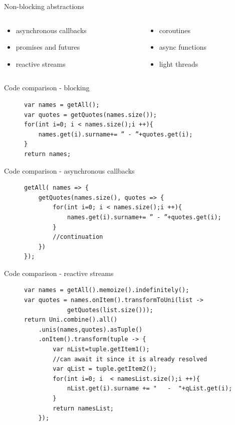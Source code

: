 \documentclass{beamer}
\begin{document}
\begin{frame}{Non-blocking abstractions}
    \begin{columns}
        \begin{column}{0.5\textwidth}
            \begin{itemize}
                \item asynchronous callbacks
                \item promises and futures
                \item reactive streams
            \end{itemize}
        \end{column}
        \begin{column}{0.5\textwidth}
            \begin{itemize}
                \item coroutines
                \item async functions
                \item light threads
            \end{itemize}
        \end{column}
    \end{columns}
\end{frame}
\begin{frame}[fragile]{Code comparison - blocking}
    \begin{figure}
        \begin{lstlisting}
var names = getAll();
var quotes = getQuotes(names.size());
for(int i=0; i < names.size();i ++){
    names.get(i).surname+= ” - ”+quotes.get(i);
}
return names;
        \end{lstlisting}
    \end{figure}
\end{frame}
\begin{frame}[fragile]{Code comparison - asynchronous callbacks}
    \begin{figure}
        \begin{lstlisting}
getAll( names => {
    getQuotes(names.size(), quotes => {
        for(int i=0; i < names.size();i ++){
            names.get(i).surname+= ” - ”+quotes.get(i);
        }
        //continuation
    })
});
        \end{lstlisting}
    \end{figure}
\end{frame}
\begin{frame}[fragile]{Code comparison - reactive streams}
    \begin{figure}
        \begin{lstlisting}
var names = getAll().memoize().indefinitely();
var quotes = names.onItem().transformToUni(list -> 
            getQuotes(list.size()));
return Uni.combine().all()
    .unis(names,quotes).asTuple()
    .onItem().transform(tuple -> {
        var nList=tuple.getItem1();
        //can await it since it is already resolved
        var qList = tuple.getItem2();
        for(int i=0; i  < namesList.size();i ++){
            nList.get(i).surname += "   -  "+qList.get(i);
        }
        return namesList;
    });
        \end{lstlisting}
    \end{figure}
\end{frame}
\end{document}
